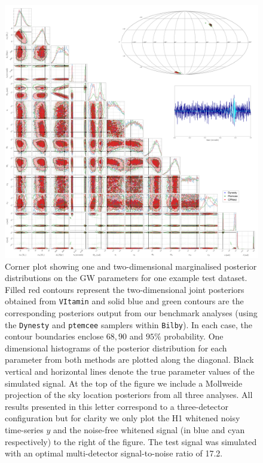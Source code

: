 \documentclass[%
showpacs,
nofootinbib,
 amsmath,amssymb,
 aps,
 twocolumn,
 prl,
 reprint,
floatfix,
]{revtex4-1}
\begin{document}
%
%
\begin{figure}
    \includegraphics[width=\textwidth]{corner_testcase0.png}
    \caption{\label{fig:corner_plot} Corner plot showing one and two-dimensional
marginalised posterior distributions on the \ac{GW} parameters for one
example test dataset. Filled red contours represent the
two-dimensional joint posteriors obtained from \texttt{VItamin} and
solid blue and green contours are the corresponding posteriors
output from our benchmark analyses (using the \texttt{Dynesty} and \texttt{ptemcee}
samplers within \texttt{Bilby}). In each case, the contour boundaries enclose
$68,90$ and $95\%$ probability. One dimensional histograms of the posterior
distribution for each parameter from both methods are plotted along the
diagonal. Black vertical and horizontal lines denote the true parameter
values of the simulated signal. At the top of the figure we include a Mollweide
projection of the sky location posteriors from all three analyses. All results
presented in this letter correspond to a three-detector configuration but for
clarity we only plot the H1 whitened noisy time-series $y$ and the noise-free
whitened signal (in blue and cyan respectively) to the right of the figure. The
test signal was simulated with an optimal multi-detector signal-to-noise ratio of
17.2.} 
\end{figure}
\end{document}
